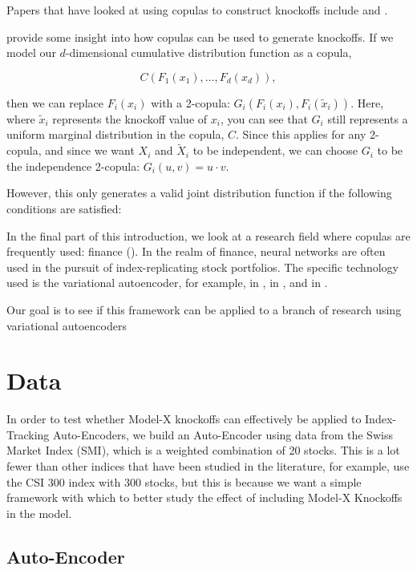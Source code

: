 \documentclass[review]{elsarticle}
\begin{document}
Papers that have looked at using copulas to construct knockoffs include \citet{aas2009pair} and \citet{vasquez2023controlling}.

\citet{berti2023new} provide some insight into how copulas can be used to generate knockoffs. If we model our $d$-dimensional cumulative distribution function as a copula,

$$C(F_1(x_1),\dots,F_d(x_d)),$$

then we can replace $F_i(x_i)$ with a 2-copula: $G_i(F_i(x_i),F_i(\tilde{x}_i))$. Here, where $\tilde{x}_i$ represents the knockoff value of $x_i$, you can see that $G_i$ still represents a uniform marginal distribution in the copula, $C$. Since this applies for any 2-copula, and since we want $X_i$ and $\tilde{X}_i$ to be independent, we can choose $G_i$ to be the independence 2-copula: $G_i(u,v)=u\cdot v$.

However, this only generates a valid joint distribution function if the following conditions are satisfied:

In the final part of this introduction, we look at a research field where copulas are frequently used: finance (\citet{embrechts2001modelling}). In the realm of finance, neural networks are often used in the pursuit of index-replicating stock portfolios. The specific technology used is the variational autoencoder, for example, in \citet{heaton2017deep}, in \citet{kim2020index}, and in \citet{zhang2020stock}.

Our goal is to see if this framework can be applied to a branch of research using variational autoencoders 

\section{Data}

In order to test whether Model-X knockoffs can effectively be applied to Index-Tracking Auto-Encoders, we build an Auto-Encoder using data from the Swiss Market Index (SMI), which is a weighted combination of 20 stocks. This is a lot fewer than other indices that have been studied in the literature, for example, \citet{zhang2020stock} use the CSI 300 index with 300 stocks, but this is because we want a simple framework with which to better study the effect of including Model-X Knockoffs in the model.

\subsection{Auto-Encoder}
\end{document}
